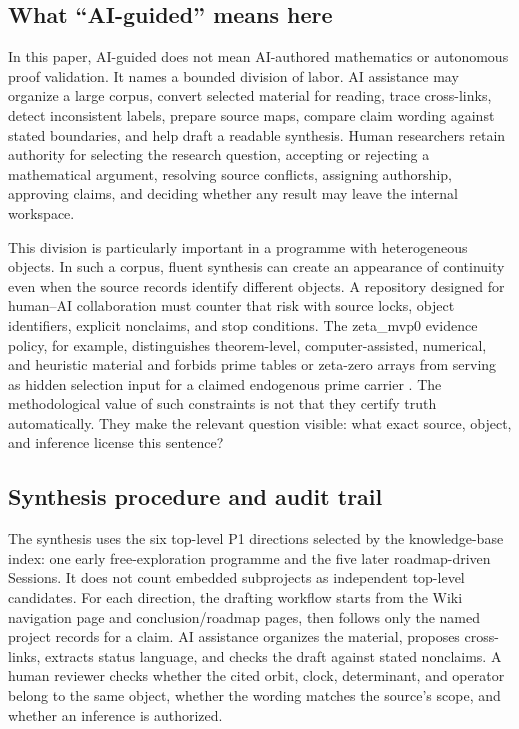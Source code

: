 \hypertarget{what-ai-guided-means-here}{%
\subsection{What ``AI-guided'' means here}\label{what-ai-guided-means-here}}

In this paper, AI-guided does not mean AI-authored mathematics or autonomous proof validation. It names a bounded division of labor. AI assistance may organize a large corpus, convert selected material for reading, trace cross-links, detect inconsistent labels, prepare source maps, compare claim wording against stated boundaries, and help draft a readable synthesis. Human researchers retain authority for selecting the research question, accepting or rejecting a mathematical argument, resolving source conflicts, assigning authorship, approving claims, and deciding whether any result may leave the internal workspace.

This division is particularly important in a programme with heterogeneous objects. In such a corpus, fluent synthesis can create an appearance of continuity even when the source records identify different objects. A repository designed for human--AI collaboration must counter that risk with source locks, object identifiers, explicit nonclaims, and stop conditions. The zeta\_mvp0 evidence policy, for example, distinguishes theorem-level, computer-assisted, numerical, and heuristic material and forbids prime tables or zeta-zero arrays from serving as hidden selection input for a claimed endogenous prime carrier . The methodological value of such constraints is not that they certify truth automatically. They make the relevant question visible: what exact source, object, and inference license this sentence?

\hypertarget{synthesis-procedure-and-audit-trail}{%
\subsection{Synthesis procedure and audit trail}\label{synthesis-procedure-and-audit-trail}}

The synthesis uses the six top-level P1 directions selected by the knowledge-base index: one early free-exploration programme and the five later roadmap-driven Sessions. It does not count embedded subprojects as independent top-level candidates. For each direction, the drafting workflow starts from the Wiki navigation page and conclusion/roadmap pages, then follows only the named project records for a claim. AI assistance organizes the material, proposes cross-links, extracts status language, and checks the draft against stated nonclaims. A human reviewer checks whether the cited orbit, clock, determinant, and operator belong to the same object, whether the wording matches the source's scope, and whether an inference is authorized.

